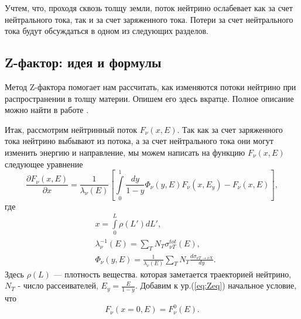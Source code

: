 Учтем, что, проходя сквозь толщу земли, поток нейтрино ослабевает как за счет нейтрального тока, так и за счет заряженного тока. Потери за счет нейтрального тока будут обсуждаться в одном из следующих разделов.
\subsection{Z-фактор: идея и формулы}
Метод Z-фактора помогает нам рассчитать, как изменяются потоки нейтрино при распространении в толщу материи. Опишем его здесь вкратце.  Полное описание можно найти в работе \cite{naumov1999}.

Итак, рассмотрим нейтринный поток $F_{\nu}(x,E)$. Так как за счет заряженного тока нейтрино выбывают из потока, а за счет нейтрального тока они могут изменить энергию и направление, мы можем написать на функцию $F_{\nu}(x,E)$ следующее уравнение
\begin{equation}
\label{eq:Zeq}
    \frac{\partial F_{\nu}(x,E)}{\partial x} = \frac{1}{\lambda_{\nu}(E)}\left[ \int\limits_0^1\frac{dy}{1-y}\Phi_{\nu}(y,E) F_{\nu}(x,E_y) - F_{\nu}(x,E) \right],
\end{equation}
где 
\begin{equation}
    \begin{aligned}
        &x = \int\limits_0^L \rho(L')dL',\\
        &\lambda^{-1}_{\nu}(E) = \sum\limits_{T}N_T\sigma^{tot}_{\nu T}(E),\\
        &\Phi_{\nu}(y,E) = \frac{1}{\lambda_{\nu}(E)}\sum\limits_{T}N_T\frac{d\sigma_{\nu T\to\nu X}}{dy}.
    \end{aligned}
\end{equation}
Здесь $\rho(L)$ — плотность вещества. которая заметается траекторией нейтрино, $N_T$ - число рассеивателей, $E_y = \frac{E}{1-y}$.
Добавим к ур.(\ref{eq:Zeq}) начальное условие, что 
\begin{equation}
    F_{\nu}(x = 0,E) = F^0_{\nu}(E).
\end{equation}

